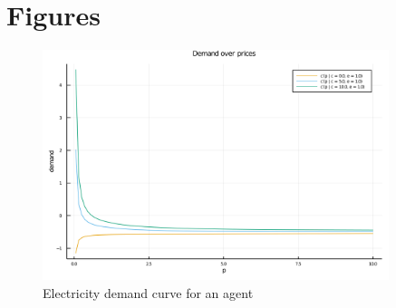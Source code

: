\documentclass[american]{scrartcl}
\begin{document}
\fi

\newpage
\section{Figures}

\begin{figure}[!ht]
	\centering
	\includegraphics[width=0.9\textwidth]{../../plots/markets/pricedemand.png}
	\caption{Electricity demand curve for an agent}
	\label{fig:demand}
\end{figure}
\end{document}

